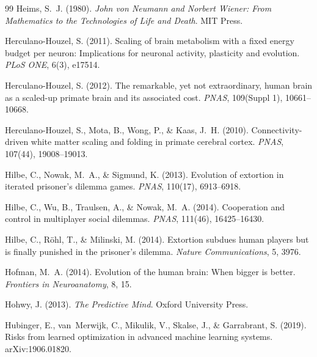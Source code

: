 \documentclass[11pt,a4paper,twocolumn]{article}
\begin{document}
\begin{thebibliography}{99}
 Heims, S.~J. (1980). \textit{John von Neumann and Norbert Wiener: From Mathematics to the Technologies of Life and Death}. MIT Press.

 Herculano-Houzel, S. (2011). Scaling of brain metabolism with a fixed energy budget per neuron: Implications for neuronal activity, plasticity and evolution. \textit{PLoS ONE}, 6(3), e17514.

 Herculano-Houzel, S. (2012). The remarkable, yet not extraordinary, human brain as a scaled-up primate brain and its associated cost. \textit{PNAS}, 109(Suppl 1), 10661--10668.

 Herculano-Houzel, S., Mota, B., Wong, P., \& Kaas, J.~H. (2010). Connectivity-driven white matter scaling and folding in primate cerebral cortex. \textit{PNAS}, 107(44), 19008--19013.

 Hilbe, C., Nowak, M.~A., \& Sigmund, K. (2013). Evolution of extortion in iterated prisoner's dilemma games. \textit{PNAS}, 110(17), 6913--6918.

 Hilbe, C., Wu, B., Traulsen, A., \& Nowak, M.~A. (2014). Cooperation and control in multiplayer social dilemmas. \textit{PNAS}, 111(46), 16425--16430.

 Hilbe, C., R\"ohl, T., \& Milinski, M. (2014). Extortion subdues human players but is finally punished in the prisoner's dilemma. \textit{Nature Communications}, 5, 3976.

 Hofman, M.~A. (2014). Evolution of the human brain: When bigger is better. \textit{Frontiers in Neuroanatomy}, 8, 15.

 Hohwy, J. (2013). \textit{The Predictive Mind}. Oxford University Press.

 Hubinger, E., van~Merwijk, C., Mikulik, V., Skalse, J., \& Garrabrant, S. (2019). Risks from learned optimization in advanced machine learning systems. arXiv:1906.01820.



\end{thebibliography}
\end{document}
